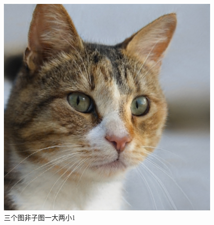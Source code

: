 \documentclass[12pt,a4paper,UTF8]{article}
\begin{document}
    \begin{figure}[!htbp]
        \centering
        \begin{minipage}[b]{0.45\textwidth}
            \centering
            \includegraphics[width=\textwidth, height=1.2\textwidth]{example}
            \caption{三个图非子图一大两小1}
             

\end{minipage}
\end{figure}
\end{document}
